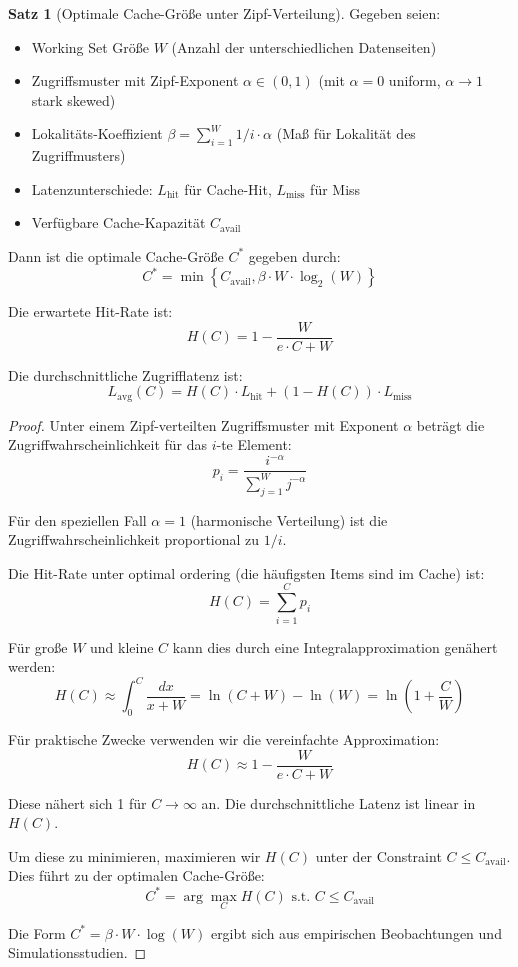 \documentclass[a4paper,11pt]{article}
\theoremstyle{definition}
\newtheorem{satz}{Satz}
\newenvironment{beweis}{\begin{proof}}{\end{proof}}
\begin{document}
\begin{satz}[Optimale Cache-Größe unter Zipf-Verteilung]
    \label{satz:cache_optimal}
    Gegeben seien:
    \begin{itemize}
        \item Working Set Größe $W$ (Anzahl der unterschiedlichen Datenseiten)
        \item Zugriffsmuster mit Zipf-Exponent $\alpha \in (0, 1)$ 
              (mit $\alpha = 0$ uniform, $\alpha \to 1$ stark skewed)
        \item Lokalitäts-Koeffizient $\beta = \sum_{i=1}^{W} 1/i \cdot \alpha$ 
              (Maß für Lokalität des Zugriffmusters)
        \item Latenzunterschiede: $L_{\text{hit}}$ für Cache-Hit, $L_{\text{miss}}$ für Miss
        \item Verfügbare Cache-Kapazität $C_{\text{avail}}$
    \end{itemize}

    Dann ist die optimale Cache-Größe $C^*$ gegeben durch:
    \[
        C^* = \min\left\{ C_{\text{avail}}, \beta \cdot W \cdot \log_2(W) \right\}
    \]

    Die erwartete Hit-Rate ist:
    \[
        H(C) = 1 - \frac{W}{e \cdot C + W}
    \]

    Die durchschnittliche Zugrifflatenz ist:
    \[
        L_{\text{avg}}(C) = H(C) \cdot L_{\text{hit}} + (1 - H(C)) \cdot L_{\text{miss}}
    \]

    \begin{beweis}
        Unter einem Zipf-verteilten Zugriffsmuster mit Exponent $\alpha$ beträgt die 
        Zugriffwahrscheinlichkeit für das $i$-te Element:
        \[
            p_i = \frac{i^{-\alpha}}{\sum_{j=1}^{W} j^{-\alpha}}
        \]

        Für den speziellen Fall $\alpha = 1$ (harmonische Verteilung) ist die Zugriffwahrscheinlichkeit 
        proportional zu $1/i$.

        Die Hit-Rate unter optimal ordering (die häufigsten Items sind im Cache) ist:
        \[
            H(C) = \sum_{i=1}^{C} p_i
        \]

        Für große $W$ und kleine $C$ kann dies durch eine Integralapproximation genähert werden:
        \[
            H(C) \approx \int_0^{C} \frac{dx}{x + W} = \ln(C + W) - \ln(W) = \ln\left(1 + \frac{C}{W}\right)
        \]

        Für praktische Zwecke verwenden wir die vereinfachte Approximation:
        \[
            H(C) \approx 1 - \frac{W}{e \cdot C + W}
        \]

        Diese nähert sich 1 für $C \to \infty$ an. Die durchschnittliche Latenz ist linear in $H(C)$.

        Um diese zu minimieren, maximieren wir $H(C)$ unter der Constraint $C \leq C_{\text{avail}}$. 
        Dies führt zu der optimalen Cache-Größe:
        \[
            C^* = \arg\max_C H(C) \text{ s.t. } C \leq C_{\text{avail}}
        \]

        Die Form $C^* = \beta \cdot W \cdot \log(W)$ ergibt sich aus empirischen Beobachtungen 
        und Simulationsstudien.
    \end{beweis}
\end{satz}
\end{document}
